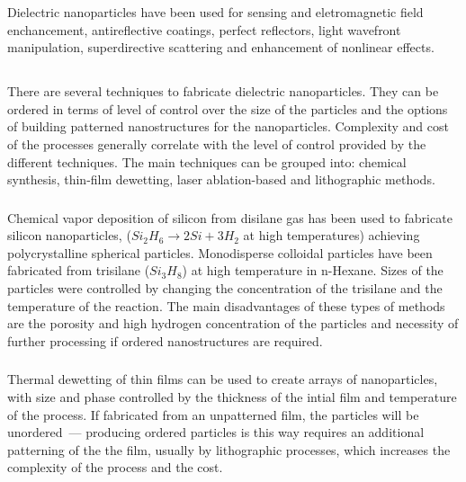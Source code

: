             Dielectric nanoparticles have been used for sensing and eletromagnetic field enchancement\cite{albella2013low,zambrana2015purcell,
        bakker2015magnetic,caldarola2015non}, antireflective coatings\cite{spinelli2012broadband},  perfect reflectors\cite{evlyukhin2010optical,
        moitra2014experimental}, light wavefront manipulation\cite{decker2015high,yu2015high}, superdirective scattering\cite{krasnok2014superdirective,
        krasnok2014experimental} and enhancement of nonlinear effects\cite{shcherbakov2014enhanced,makarov2015tuning}.

    \subsection{}
            There are several techniques to fabricate dielectric nanoparticles. They can be ordered in terms of level of control over the size
        of the particles and the options of building patterned nanostructures for the nanoparticles. Complexity and cost of the processes generally
        correlate with the level of control provided by the different techniques.
            The main techniques can be grouped into: chemical synthesis\cite{shi2012new}, thin-film dewetting\cite{abbarchi2014wafer},
        laser ablation-based\cite{zywietz2014laser} and lithographic methods.

        \subsubsection{}
                Chemical vapor deposition of silicon from disilane gas has been used to fabricate silicon nanoparticles, ($Si_2H_6 \rightarrow 2Si + 3H_2$ at
            high temperatures) achieving polycrystalline spherical particles. Monodisperse colloidal particles have been fabricated from trisilane ($Si_3H_8$)
            at high temperature in n-Hexane. Sizes of the particles were controlled by changing the concentration of the trisilane and the temperature of the
            reaction. The main disadvantages of these types of methods are the porosity and high hydrogen concentration of the particles and necessity of
            further processing if ordered nanostructures are required.

        \subsubsection{}
                Thermal dewetting of thin films can be used to create arrays of nanoparticles, with size and phase controlled by the thickness of the intial
            film and temperature of the process. If fabricated from an unpatterned film, the particles will be unordered~--- producing ordered particles is this
            way requires an additional patterning of the the film, usually by lithographic processes, which increases the complexity of the process and the cost.
